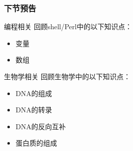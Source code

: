 \begin{frame}
  \frametitle{下节预告}
  \begin{block}{编程相关}
    回顾shell/Perl中的以下知识点：
    \begin{itemize}
      \item 变量
      \item 数组
    \end{itemize}
  \end{block}
  \begin{block}{生物学相关}
    回顾生物学中的以下知识点：
    \begin{itemize}
      \item DNA的组成
      \item DNA的转录
      \item DNA的反向互补
      \item 蛋白质的组成
    \end{itemize}
  \end{block}
\end{frame}



